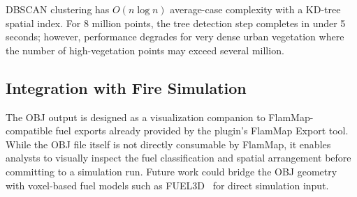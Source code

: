 DBSCAN clustering has $O(n \log n)$ average-case complexity with a KD-tree spatial index. For 8 million points, the tree detection step completes in under 5 seconds; however, performance degrades for very dense urban vegetation where the number of high-vegetation points may exceed several million.

\subsection{Integration with Fire Simulation}

The OBJ output is designed as a visualization companion to FlamMap-compatible fuel exports already provided by the plugin's FlamMap Export tool. While the OBJ file itself is not directly consumable by FlamMap, it enables analysts to visually inspect the fuel classification and spatial arrangement before committing to a simulation run. Future work could bridge the OBJ geometry with voxel-based fuel models such as FUEL3D~\cite{parsons2011} for direct simulation input.
